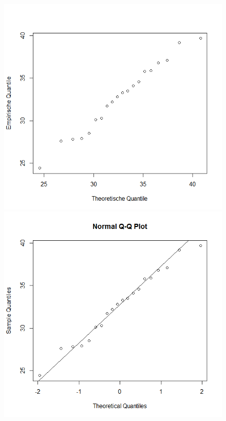 		\begin{figure}[H]
			\begin{minipage}[c]{0.5\textwidth}
				\includegraphics[width=1\linewidth]{images/qqPlot.png}
			\end{minipage}\hfill
			\begin{minipage}[c]{0.5\textwidth}
				\includegraphics[width=1\linewidth]{images/qqNormLine.png}
			\end{minipage}\\
			\begin{minipage}[t]{.5\textwidth}
			\end{minipage}\hfill
			\begin{minipage}[t]{.5\textwidth}
			\end{minipage}
		\end{figure}
